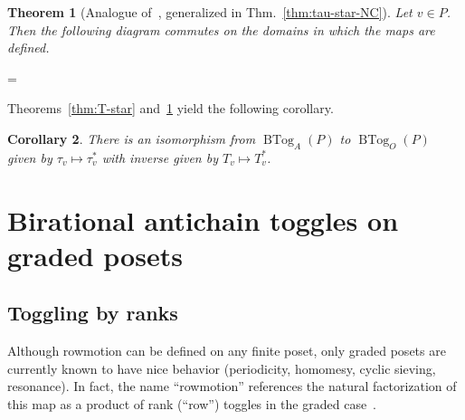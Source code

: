 \documentclass[10pt]{amsart}
\newtheorem{theo}{Theorem}[section]
\newtheorem{coro}[theo]{Corollary}
\theoremstyle{definition}
\newcommand{\kk}{\mathbb{K}}
\newcommand{\up}{\Delta}
\DeclareMathOperator{\btog}{BTog}
\newenvironment{absolutelynopagebreak}
 {\par\nobreak\vfil\penalty0\vfilneg
 \vtop\bgroup}
 {\par\xdef\tpd{\the\prevdepth}\egroup
 \prevdepth=\tpd}
\begin{document}
\begin{absolutelynopagebreak}
\begin{theo}[{Analogue of~\cite[Thm.~2.19]{antichain-toggling}, generalized in Thm.~\ref{thm:tau-star-NC}}]\label{thm:tau-star}
Let $v\in P$. Then the following diagram commutes on the domains in which the maps are defined.
\begin{center}
\end{center}
\end{theo}
\end{absolutelynopagebreak}

Theorems~\ref{thm:T-star} and~\ref{thm:tau-star}
yield the following corollary.

\begin{coro}
There is an isomorphism from $\btog_A(P)$ to
$\btog_O(P)$ given by $\tau_v \mapsto \tau_v^*$
with inverse given by $T_v \mapsto T_v^*$.
\end{coro}

\section{Birational antichain toggles on graded posets}\label{sec:graded}

\subsection{Toggling by ranks}

Although rowmotion can be defined on any finite poset,
only graded posets are currently known to have nice behavior (periodicity, homomesy, cyclic sieving, resonance).
In fact, the name ``rowmotion'' references the natural factorization of this map as a
product of rank (``row'') toggles in the graded case~\cite{strikerwilliams}.
\end{document}
